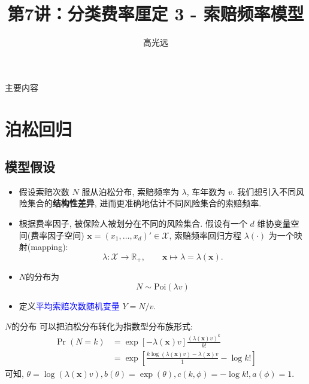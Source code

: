 \documentclass[professionalfont]{beamer}
\title{第7讲：分类费率厘定 3 - 索赔频率模型}
\author{高光远}
\institute{中国人民大学~统计学院}
\date{}
\def\R{{\mathbb R}}  %
\def\bx{\boldsymbol{x}}
\newcommand{\blue}[1]{\textcolor{blue}{#1}}
\begin{document}
\begin{frame}
	\titlepage
\end{frame}

\begin{frame}{主要内容}
	\tableofcontents
\end{frame}




\section{泊松回归}
\subsection{模型假设}
\begin{frame}
	\begin{itemize}
	\item 假设索赔次数 $N$ 服从泊松分布, 索赔频率为 $\lambda$, 车年数为 $v$. 我们想引入不同风险集合的\textbf{结构性差异}, 进而更准确地估计不同风险集合的索赔频率. 
	\item 根据费率因子, 被保险人被划分在不同的风险集合. 假设有一个 $d$ 维协变量空间(费率因子空间) $\bx=(x_1,\ldots,x_d)'\in \mathcal{X}$, 索赔频率回归方程 $\lambda(\cdot)$ 为一个映射(mapping):
		$$\lambda: \mathcal{X}\rightarrow\R_+, \qquad \bx\mapsto\lambda=\lambda(\bx).$$
	\item $N$的分布为
		$$N\sim \text{Poi}(\lambda v)$$
\item 定义\blue{平均索赔次数随机变量} $Y=N/v$.
	\end{itemize}
\end{frame}
\begin{frame}{$N$的分布}
	可以把泊松分布转化为指数型分布族形式:
	\begin{equation}
	\begin{aligned}
	\Pr(N=k)&=\exp\left[-\lambda(\bx)v\right]\frac{(\lambda(\bx)v)^k}{k!}\\&=\exp\left[\frac{k\log(\lambda(\bx)v)-\lambda(\bx)v}{1}-\log k!\right]
	\end{aligned}
	\end{equation}
	可知, $\theta=\log(\lambda(\bx)v), b(\theta)=\exp(\theta), c(k,\phi)=-\log k!, a(\phi)=1$.

\end{frame}
\end{document}
